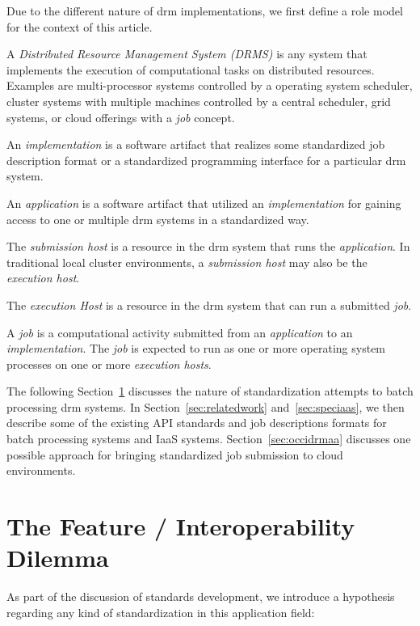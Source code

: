 \documentclass[twocolumn]{svjour3}       %
\begin{document}
\label{sec:rolemodel}

Due to the different nature of \gls{drm} implementations, we first define a role model for the context of this article.

A \emph{Distributed Resource Management System (DRMS)} is any system that implements the execution of computational tasks on distributed resources. Examples are multi-processor systems controlled by a operating system scheduler, cluster systems with multiple machines controlled by a central scheduler, grid systems, or cloud offerings with a \emph{job} concept.

An \emph{implementation} is a software artifact that realizes some standardized job description format or a standardized programming interface for a particular \gls{drm} system.

An \emph{application} is a software artifact that utilized an \emph{implementation} for gaining access to one or multiple \gls{drm} systems in a standardized way.

The \emph{submission host} is a resource in the \gls{drm} system that runs the \emph{application}. In traditional local cluster environments, a \emph{submission host} may also be the \emph{execution host}.

The \emph{execution Host} is a resource in the \gls{drm} system that can run a submitted \emph{job}.

A \emph{job} is a computational activity submitted from an \emph{application} to an \emph{implementation}. The \emph{job} is expected to run as one or more operating system processes on one or more \emph{execution hosts}.

The following Section~\ref{sec:hypothesis} discusses the nature of standardization attempts to batch processing \gls{drm} systems.  In Section~\ref{sec:relatedwork} and~\ref{sec:speciaas}, we then describe some of the existing API standards and job descriptions formats for batch processing systems and IaaS systems.  Section~\ref{sec:occidrmaa} discusses one possible approach for bringing standardized job submission to cloud environments. 

\section{The Feature / Interoperability Dilemma}
\label{sec:hypothesis}

As part of the discussion of standards development, we introduce a hypothesis regarding any kind of standardization in this application field:
\end{document}
